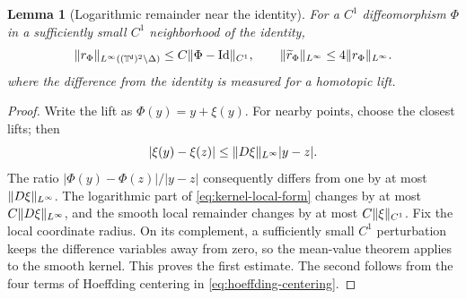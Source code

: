 \documentclass[11pt,reqno]{amsart}
\numberwithin{equation}{section}
\theoremstyle{plain}
\newtheorem{lemma}[lemma]{Lemma}
\theoremstyle{definition}
\DeclarePairedDelimiter{\norm}{\lVert}{\rVert}
\renewcommand{\d}{\mathsf d}
\newcommand{\T}{\mathbb T}
\newcommand{\Id}{\operatorname{Id}}
\newcommand{\diag}{\Delta}
\newcommand{\tl}{\widetilde}
\begin{document}
\begin{lemma}[Logarithmic remainder near the identity]
\label{lem:near-identity-logarithmic-remainder}
For a $C^1$ diffeomorphism $\Phi$ in a sufficiently small $C^1$ neighborhood of the identity,
\begin{equation}
 \norm{r_{\Phi}}_{L^\infty((\T^{\d})^2\setminus\diag)}
 \leq C\norm{\Phi-\Id}_{C^1},
 \qquad
 \norm{\tl r_{\Phi}}_{L^\infty}
 \leq4\norm{r_{\Phi}}_{L^\infty}.
 \label{eq:near-identity-remainder-bound}
\end{equation}
where the difference from the identity is measured for a homotopic lift.
\end{lemma}
\begin{proof}
Write the lift as $\Phi(y)=y+\xi(y)$. For nearby points, choose the closest lifts; then
\begin{equation}
 |\xi(y)-\xi(z)|\leq\norm{D\xi}_{L^\infty}|y-z|.
 \label{eq:relative-displacement}
\end{equation}
The ratio $|\Phi(y)-\Phi(z)|/|y-z|$ consequently differs from one by at most $\norm{D\xi}_{L^\infty}$. The logarithmic part of \eqref{eq:kernel-local-form} changes by at most $C\norm{D\xi}_{L^\infty}$, and the smooth local remainder changes by at most $C\norm\xi_{C^1}$. Fix the local coordinate radius. On its complement, a sufficiently small $C^1$ perturbation keeps the difference variables away from zero, so the mean-value theorem applies to the smooth kernel. This proves the first estimate. The second follows from the four terms of Hoeffding centering in \eqref{eq:hoeffding-centering}.
\end{proof}
\end{document}
